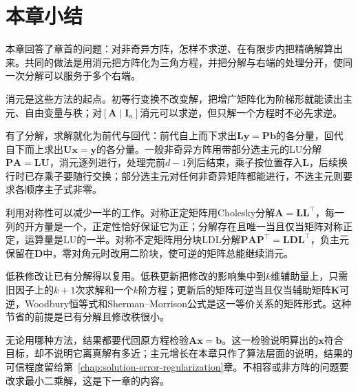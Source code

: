 \FloatBarrier
\section{本章小结}
\label{sec:direct-methods-summary}

本章回答了章首的问题：对非奇异方阵，怎样不求逆、在有限步内把精确解算出来。共同的做法是用消元把方阵化为三角方程，并把分解与右端的处理分开，使同一次分解可以服务于多个右端。

消元是这些方法的起点。初等行变换不改变解，把增广矩阵化为阶梯形就能读出主元、自由变量与秩；对$[\bm A\mid\bm I_n]$消元可以求逆，但只解一个方程时不必先求逆。

有了分解，求解就化为前代与回代：前代自上而下求出$\bm L\bm y=\bm P\bm b$的各分量，回代自下而上求出$\bm U\bm x=\bm y$的各分量。一般非奇异方阵用带部分选主元的LU分解$\bm P\bm A=\bm L\bm U$，消元逐列进行，处理完前$d-1$列后结束，乘子按位置存入$\bm L$，后续换行时已存乘子要随行交换；部分选主元对任何非奇异矩阵都能进行，不选主元则要求各顺序主子式非零。

利用对称性可以减少一半的工作。对称正定矩阵用Cholesky分解$\bm A=\bm L\bm L^\top$，每一列的开方量是一个，正定性恰好保证它为正；分解存在且唯一当且仅当矩阵对称正定，运算量是LU的一半。对称不定矩阵用分块LDL分解$\bm P\bm A\bm P^\top=\bm L\bm D\bm L^\top$，负主元保留在$\bm D$中，零对角元时改用二阶块，使可逆的矩阵总能继续消元。

低秩修改让已有分解得以复用。低秩更新把修改的影响集中到$k$维辅助量上，只需旧因子上的$k+1$次求解和一个$k$阶方程；更新后的矩阵可逆当且仅当辅助矩阵$\bm K$可逆，Woodbury恒等式和Sherman--Morrison公式是这一等价关系的矩阵形式。这种节省的前提是已有分解且修改秩很小。

无论用哪种方法，结果都要代回原方程检验$\bm A\bm x=\bm b$。这一检验说明算出的$\bm x$符合目标，却不说明它离真解有多近；主元增长在本章只作了算法层面的说明，结果的可信程度留给第~\ref{chap:solution-error-regularization}章。不相容或非方阵的问题要改求最小二乘解，这是下一章的内容。
